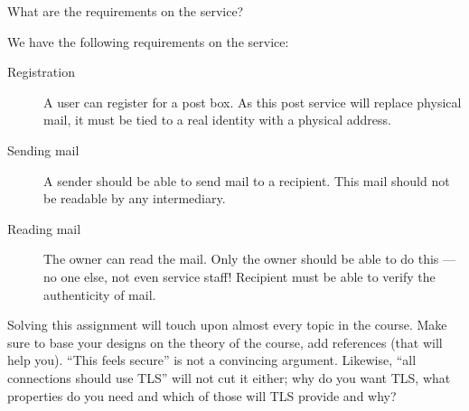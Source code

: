 \begin{frame}
\begin{exercise}
  What are the requirements on the service?
\end{exercise}
\end{frame}

We have the following requirements on the service:
\begin{frame}
\begin{description}
  \item[Registration]
    A user can register for a post box.
    As this post service will replace physical mail, it must be tied to a real 
    identity with a physical address.

    \pause

  \item[Sending mail]
    A sender should be able to send mail to a recipient.
    This mail should not be readable by any intermediary.

  \item[Reading mail]
    The owner can read the mail.
    Only the owner should be able to do this --- no one else, not even service 
    staff!
    Recipient must be able to verify the authenticity of mail.
%
\end{description}
\end{frame}

Solving this assignment will touch upon almost every topic in the course.
Make sure to base your designs on the theory of the course, add references 
(that will help you).
\enquote{This feels secure} is not a convincing argument.
Likewise, \enquote{all connections should use TLS} will not cut it either; why 
do you want TLS, what properties do you need and which of those will TLS 
provide and why?

